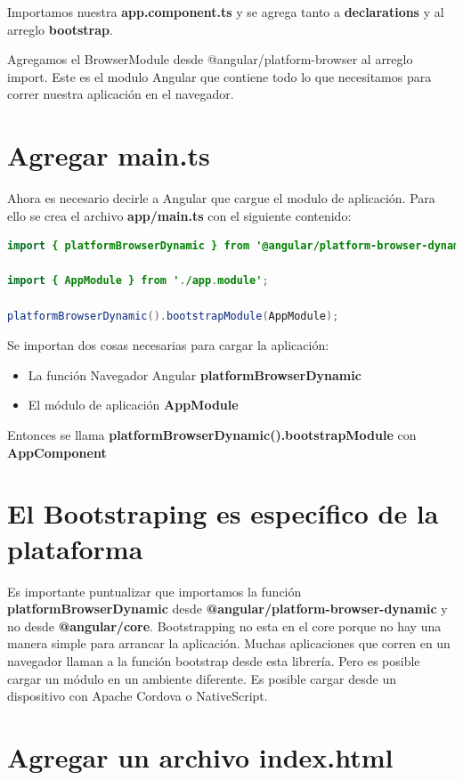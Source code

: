 \documentclass[12pt,twoside]{book}
\begin{document}
Importamos nuestra \textbf{app.component.ts} y se agrega tanto a \textbf{declarations} y al arreglo \textbf{bootstrap}.
 
Agregamos el BrowserModule desde @angular/platform-browser al arreglo import. Este es el modulo Angular que contiene todo lo que necesitamos para correr nuestra aplicación en el navegador.

\section{Agregar main.ts}

Ahora es necesario decirle a Angular que cargue el modulo de aplicación. Para ello se crea el archivo \textbf{app/main.ts} con el siguiente contenido:
\begin{lstlisting}[language=java]
import { platformBrowserDynamic } from '@angular/platform-browser-dynamic';

import { AppModule } from './app.module';

platformBrowserDynamic().bootstrapModule(AppModule);
\end{lstlisting}

Se importan dos cosas necesarias para cargar la aplicación:


\begin{itemize}
\item La función Navegador Angular  \textbf{platformBrowserDynamic}
\item El módulo de aplicación \textbf{AppModule}
\end{itemize}

Entonces se llama \textbf{platformBrowserDynamic().bootstrapModule} con \textbf{AppComponent}

\section{El Bootstraping es específico de la plataforma }

Es importante puntualizar que importamos la función \textbf{platformBrowserDynamic} desde \textbf{@angular/platform-browser-dynamic} y no desde \textbf{@angular/core}. Bootstrapping no esta en el core porque no hay una manera simple para arrancar la aplicación. Muchas aplicaciones que corren en un navegador llaman a la función bootstrap desde esta librería. Pero es posible cargar un módulo en un ambiente diferente. Es posible cargar desde un dispositivo con Apache Cordova o NativeScript. 

\section{Agregar un archivo index.html}
\end{document}
